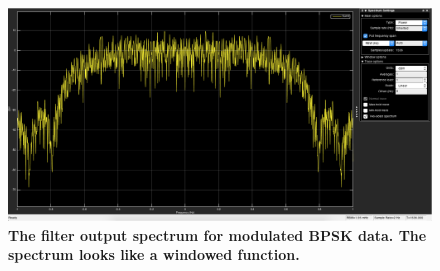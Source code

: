 \documentclass[letterpaper,12pt]{article}
\begin{document}
\begin{figure}[hbtp]
\includegraphics[width=1.0\columnwidth]{prelab1-filter-output-spectrum}
\caption{
\label{fig:prelab1-filter-output-spectrum}
{\bf The filter output spectrum for modulated BPSK data. The spectrum looks
like a windowed function.
}
}
\end{figure}
\end{document}
